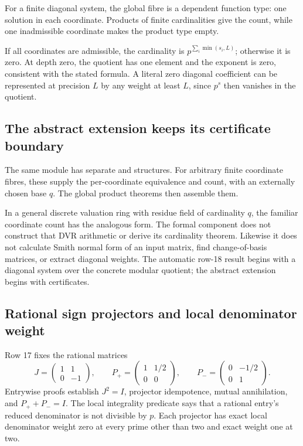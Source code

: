For a finite diagonal system, the global fibre is a dependent function type: one solution in each coordinate. Products of finite cardinalities give the count, while one inadmissible coordinate makes the product type empty.

If all coordinates are admissible, the cardinality is $p^{\sum_i\min(s_i,L)}$; otherwise it is zero. At depth zero, the quotient has one element and the exponent is zero, consistent with the stated formula. A literal zero diagonal coefficient can be represented at precision $L$ by any weight at least $L$, since $p^s$ then vanishes in the quotient.

\subsection{The abstract extension keeps its certificate boundary}

The same module has separate  and  structures. For arbitrary finite coordinate fibres, these supply the per-coordinate equivalence and count, with an externally chosen base $q$. The global product theorems then assemble them.

In a general discrete valuation ring with residue field of cardinality $q$, the familiar coordinate count has the analogous form. The formal component does not construct that DVR arithmetic or derive its cardinality theorem. Likewise it does not calculate Smith normal form of an input matrix, find change-of-basis matrices, or extract diagonal weights. The automatic row-18 result begins with a diagonal system over the concrete modular quotient; the abstract extension begins with certificates.

\subsection{Rational sign projectors and local denominator weight}

Row 17 fixes the rational matrices
\[
J=\begin{pmatrix}1&1\\0&-1\end{pmatrix},\qquad
P_+=\begin{pmatrix}1&1/2\\0&0\end{pmatrix},\qquad
P_-=\begin{pmatrix}0&-1/2\\0&1\end{pmatrix}.
\]
Entrywise proofs establish $J^2=I$, projector idempotence, mutual annihilation, and $P_++P_-=I$. The local integrality predicate says that a rational entry's reduced denominator is not divisible by $p$. Each projector has exact local denominator weight zero at every prime other than two and exact weight one at two.

